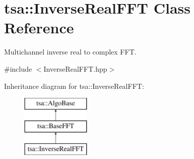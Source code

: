 \hypertarget{classtsa_1_1_inverse_real_f_f_t}{}\section{tsa\+:\+:Inverse\+Real\+F\+FT Class Reference}
\label{classtsa_1_1_inverse_real_f_f_t}


Multichannel inverse real to complex F\+FT.  




{\ttfamily \#include $<$Inverse\+Real\+F\+F\+T.\+hpp$>$}

Inheritance diagram for tsa\+:\+:Inverse\+Real\+F\+FT\+:\begin{figure}[H]
\begin{center}
\leavevmode
\includegraphics[height=3.000000cm]{classtsa_1_1_inverse_real_f_f_t}
\end{center}
\end{figure}
